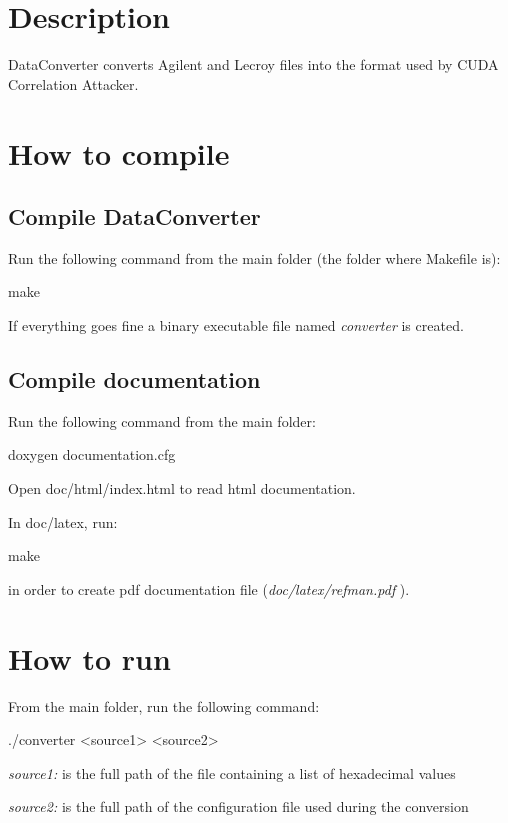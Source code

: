 \hypertarget{index_s02}{}\section{Description}\label{index_s02}
DataConverter converts Agilent and Lecroy files into the format used by CUDA Correlation Attacker.\hypertarget{index_s03}{}\section{How to compile}\label{index_s03}
\hypertarget{index_s031}{}\subsection{Compile DataConverter}\label{index_s031}
Run the following command from the main folder (the folder where Makefile is): 
\begin{DoxyCode}
make
\end{DoxyCode}
 If everything goes fine a binary executable file named {\itshape converter\/} is created. \hypertarget{index_s032}{}\subsection{Compile documentation}\label{index_s032}
Run the following command from the main folder: 
\begin{DoxyCode}
doxygen documentation.cfg
\end{DoxyCode}
 Open doc/html/index.html to read html documentation.\par
 In doc/latex, run: 
\begin{DoxyCode}
make
\end{DoxyCode}
 in order to create pdf documentation file ({\itshape doc/latex/refman.pdf\/} ).\hypertarget{index_s04}{}\section{How to run}\label{index_s04}
From the main folder, run the following command: 
\begin{DoxyCode}
./converter <source1> <source2>
\end{DoxyCode}
 \begin{DoxyItemize}
\item {\itshape source1:\/} is the full path of the file containing a list of hexadecimal values \item {\itshape source2:\/} is the full path of the configuration file used during the conversion\end{DoxyItemize}
